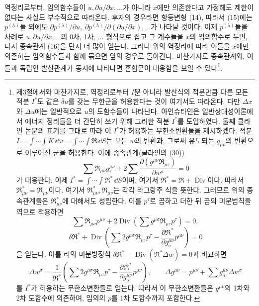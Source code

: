 역정리로부터, 임의함수들이 \(u,\partial u/\partial x,\ldots\)가 아니라 \(x\)에만 의존한다고 가정해도 제한이 없다는 사실도 부수적으로 따라온다. 후자의 경우라면 항등변형 (14), 따라서 (15)에는 \(p^{(\lambda)}\)들 외에도 \(\partial p^{(\lambda)}/\partial u,\ \partial p^{(\lambda)}/\partial(\partial u/\partial x),\ldots\)가 나타날 것이다. 이제 \(p^{(\lambda)}\)들을 차례로 \(u,\partial u/\partial x,\ldots\)의 0차, 1차, \(\ldots\) 형식으로 잡고 그 계수들을 \(x\)의 임의함수로 두면, 다시 종속관계 (16)을 단지 더 많이 얻는다. 그러나 위의 역정리에 따라 이들을 \(x\)에만 의존하는 임의함수들과 함께 묶으면 앞의 경우로 돌아간다. 마찬가지로 종속관계와, 이들과 독립인 발산관계가 동시에 나타나면 혼합군이 대응함을 보일 수 있다\footnote{제3절에서와 마찬가지로, 역정리로부터 \(I\)뿐 아니라 발산식의 적분만큼 다른 모든 적분 \(I^*\)도 같은 \(\bar\delta u\)를 갖는 무한군을 허용한다는 것이 여기서도 따라온다. 다만 \(\Delta x\)와 \(\Delta u\)에는 일반적으로 \(u\)의 도함수들이 나타난다. 아인슈타인은 일반상대성이론에서 에너지 정리들을 더 간단히 쓰기 위해 그러한 적분 \(I^*\)를 도입하였다. 둘째 클라인 논문의 표기를 그대로 따라 이 \(I^*\)가 허용하는 무한소변환들을 제시하겠다. 적분 \(I=\int\!\cdots\!\int K\,\dd\omega=\int\!\cdots\!\int\mathfrak R\,\dd S\)는 모든 \(w\)의 변환과, 그로써 유도되는 \(g_{\mu\nu}\)의 변환으로 이루어진 군을 허용한다. 이에 종속관계(클라인의 (30))
\[
\sum\mathfrak R_{\mu\nu}g_\tau^{\mu\nu}
+2\sum\frac{\partial(g^{\mu\nu}\mathfrak R_{\mu\tau})}{\partial w^\sigma}=0
\]
가 대응한다. 이제 \(I^*=\int\!\cdots\!\int\mathfrak R^*\,\dd S\)이며, 여기서 \(\mathfrak R^*=\mathfrak R+\operatorname{Div}\)이다. 따라서 \(\mathfrak R_{\mu\nu}^*=\mathfrak R_{\mu\nu}\)이다. 여기서 \(\mathfrak R_{\mu\nu}^*,\mathfrak R_{\mu\nu}\)는 각각 라그랑주 식을 뜻한다. 그러므로 위의 종속관계들은 \(\mathfrak R_{\mu\nu}^*\)에 대해서도 성립한다. 이를 \(p^\tau\)로 곱하고 더한 뒤 곱의 미분법칙을 역으로 적용하면
\[
\sum\mathfrak R_{\mu\nu}p^{\mu\nu}
+2\operatorname{Div}\!\left(\sum g^{\mu\sigma}\mathfrak R_{\mu\tau}p^\tau\right)=0,
\]
\[
\delta\mathfrak R^*+\operatorname{Div}\!\left(
\sum2g^{\mu\sigma}\mathfrak R_{\mu\tau}p^\tau
-\frac{\partial\mathfrak R^*}{\partial g^{\mu\nu}_\sigma}p^{\mu\nu}
\right)=0
\]
을 얻는다. 이를 리의 미분방정식 \(\delta\mathfrak R^*+\operatorname{Div}(\mathfrak R^*\Delta w)=0\)과 비교하면
\[
\Delta w^\sigma=\frac1{\mathfrak R^*}\left(
\sum2g^{\mu\sigma}\mathfrak R_{\mu\tau}p^\tau
-\frac{\partial\mathfrak R^*}{\partial g^{\mu\nu}_\sigma}p^{\mu\nu}
\right),
\qquad
\Delta g^{\mu\nu}=p^{\mu\nu}+\sum g^{\mu\nu}_\sigma\Delta w^\sigma
\]
를 \(I^*\)가 허용하는 무한소변환들로 얻는다. 따라서 이 무한소변환들은 \(g^{\mu\nu}\)의 1차와 2차 도함수에 의존하며, 임의의 \(p\)를 1차 도함수까지 포함한다.}.

